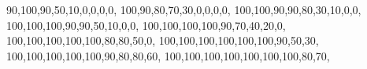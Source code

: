 {90,100,90,50,10,0,0,0,0},
{100,90,80,70,30,0,0,0,0},
{100,100,90,90,80,30,10,0,0},
{100,100,100,90,90,50,10,0,0},
{100,100,100,100,90,70,40,20,0},
{100,100,100,100,100,80,80,50,0},
{100,100,100,100,100,100,90,50,30},
{100,100,100,100,100,90,80,80,60},
{100,100,100,100,100,100,100,80,70},
